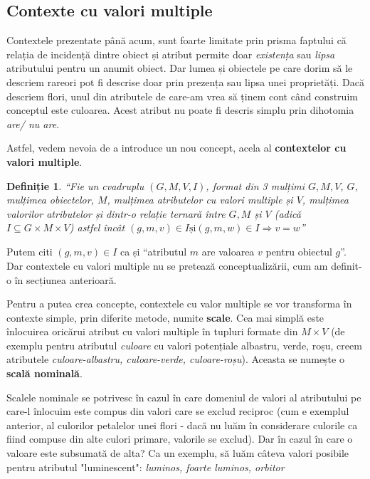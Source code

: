\documentclass[12pt, a4paper, twoside, romanian]{teza-upb}
\newtheorem{defn}{Definiție}
\begin{document}
    \subsection{Contexte cu valori multiple}

      Contextele prezentate până acum, sunt foarte limitate prin prisma faptului că relația de incidență dintre obiect și atribut permite doar \textit{existența} sau \textit{lipsa} atributului pentru un anumit obiect.
      Dar lumea și obiectele pe care dorim să le descriem rareori pot fi descrise doar prin prezența sau lipsa unei proprietăți. Dacă descriem flori, unul din atributele de care-am vrea să ținem cont când construim conceptul este culoarea. Acest atribut nu poate fi descris simplu prin dihotomia \textit{are/ nu are}.

      Astfel, vedem nevoia de a introduce un nou concept, acela al \textbf{contextelor cu valori multiple}.

      \begin{defn}
        \cite{Carpineto:2004:CDA:975252} ``Fie un cvadruplu $(G, M, V, I)$, format din 3 mulțimi $G, M, V$, $G$, mulțimea obiectelor, $M$, mulțimea atributelor cu valori multiple și $V$, mulțimea valorilor atributelor și dintr-o relație ternară între $G, M$ și $V$ (adică $I \subseteq G \times M \times V $) astfel încât $(g, m, v) \in I \text{și} (g, m, w) \in I \Rightarrow v = w$''
      \end{defn}


      Putem citi $(g, m, v) \in I$ ca și ``atributul $m$ are valoarea $v$ pentru obiectul $g$''. Dar contextele cu valori multiple nu se pretează conceptualizării, cum am definit-o în secțiunea anterioară. 
      
      Pentru a putea crea concepte, contextele cu valor multiple se vor transforma în contexte simple, prin diferite metode, numite \textbf{scale}. Cea mai simplă este înlocuirea oricărui atribut cu valori multiple în tupluri formate din $M \times V$ (de exemplu pentru atributul \textit{culoare} cu valori potențiale {albastru, verde, roșu}, creem atributele \textit{culoare-albastru, culoare-verde, culoare-roșu}). Aceasta se numește o \textbf{scală nominală}.

      Scalele nominale se potrivesc în cazul în care domeniul de valori al atributului pe care-l înlocuim este compus din valori care se exclud reciproc (cum e exemplul anterior, al culorilor petalelor unei flori - dacă nu luăm în considerare culorile ca fiind compuse din alte culori primare, valorile se exclud). Dar în cazul în care o valoare este subsumată de alta? Ca un exemplu, să luăm câteva valori posibile pentru atributul "luminescent": {\textit{luminos, foarte luminos, orbitor}}
\end{document}

